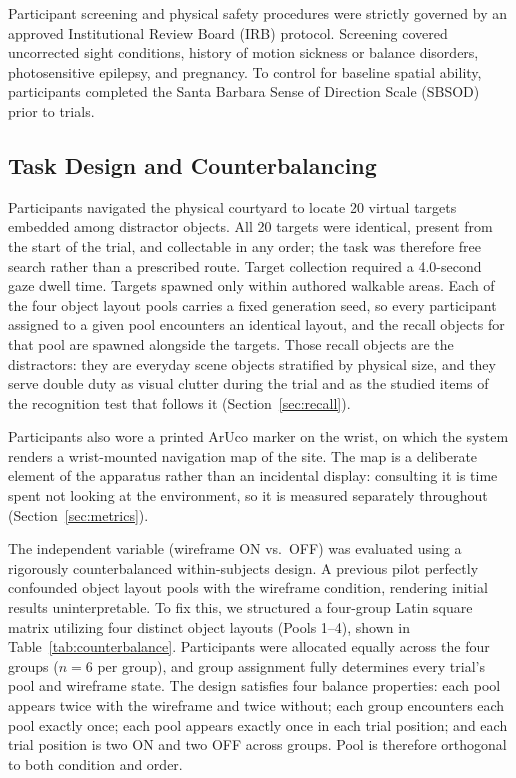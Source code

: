 Participant screening and physical safety procedures were strictly governed by
an approved Institutional Review Board (IRB) protocol. Screening covered
uncorrected sight conditions, history of motion sickness or balance disorders,
photosensitive epilepsy, and pregnancy. To control for baseline spatial
ability, participants completed the Santa Barbara Sense of Direction Scale
(SBSOD) prior to trials.

\subsection{Task Design and Counterbalancing}

Participants navigated the physical courtyard to locate 20 virtual targets
embedded among distractor objects. All 20 targets were identical, present from
the start of the trial, and collectable in any order; the task was therefore
free search rather than a prescribed route. Target collection required a
4.0-second gaze dwell time. Targets spawned only within authored walkable
areas. Each of the four object layout pools carries a fixed generation seed, so
every participant assigned to a given pool encounters an identical layout, and
the recall objects for that pool are spawned alongside the targets. Those
recall objects are the distractors: they are everyday scene objects stratified
by physical size, and they serve double duty as visual clutter during the
trial and as the studied items of the recognition test that follows it
(Section~\ref{sec:recall}).

Participants also wore a printed ArUco marker on the wrist, on which the system
renders a wrist-mounted navigation map of the site. The map is a deliberate
element of the apparatus rather than an incidental display: consulting it is
time spent not looking at the environment, so it is measured separately
throughout (Section~\ref{sec:metrics}).

The independent variable (wireframe ON vs.\ OFF) was evaluated using a
rigorously counterbalanced within-subjects design. A previous pilot perfectly
confounded object layout pools with the wireframe condition, rendering initial
results uninterpretable. To fix this, we structured a four-group Latin square
matrix utilizing four distinct object layouts (Pools 1--4), shown in
Table~\ref{tab:counterbalance}. Participants were allocated equally across the
four groups ($n=6$ per group), and group assignment fully determines every
trial's pool and wireframe state. The design satisfies four balance
properties: each pool appears twice with the wireframe and twice without; each
group encounters each pool exactly once; each pool appears exactly once in
each trial position; and each trial position is two ON and two OFF across
groups. Pool is therefore orthogonal to both condition and order.

